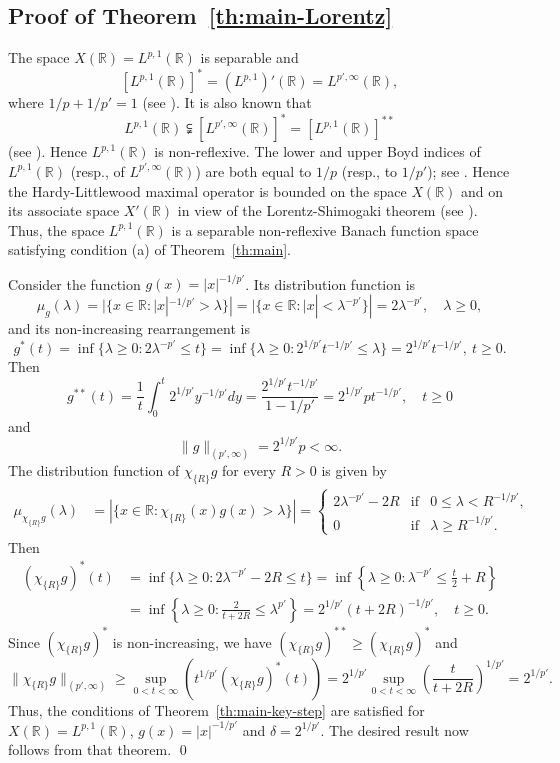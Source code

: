 \documentclass[reqno]{amsproc}
\newcommand{\R}{\mathbb{R}}
\theoremstyle{definition}
\theoremstyle{remark}
\numberwithin{equation}{section}
\begin{document}
\subsection{Proof of Theorem~\ref{th:main-Lorentz}}
The space $X(\mathbb{R}) = L^{p, 1}(\mathbb{R})$ is separable and 
\[
\left[L^{p, 1}(\mathbb{R})\right]^* 
= 
\left(L^{p, 1}\right)' (\mathbb{R})
= 
L^{p', \infty}(\mathbb{R}),
\]
where $1/p + 1/p' = 1$ (see \cite[Chap. 1, Corollaries 4.3 and 5.6, 
Chap. 4, Corollary 4.8]{BS88}). 
It is also known that 
\[
L^{p,1}(\R)\subsetneqq [L^{p',\infty}(\R)]^*=[L^{p,1}(\R)]^{**}
\]
(see \cite[p.~83]{C75}). Hence $L^{p,1}(\R)$ is non-reflexive.
The lower and upper Boyd indices of 
$L^{p, 1}(\mathbb{R})$ (resp., of $L^{p', \infty}(\mathbb{R})$) are both 
equal to $1/p$ (resp., to $1/p'$); see \cite[Chap. 4, Theorem 4.6]{BS88}. 
Hence the Hardy-Littlewood maximal operator is bounded on the space 
$X(\mathbb{R})$ and on its associate space $X'(\mathbb{R})$ in view of the 
Lorentz-Shimogaki theorem (see \cite[Chap. 3, Theorem 5.17]{BS88}). Thus, the 
space $L^{p,1}(\R)$ is a separable non-reflexive Banach function space
satisfying condition (a) of Theorem~\ref{th:main}.

Consider the function $g(x)=|x|^{-1/p'}$. Its distribution function is
\[
\mu_g(\lambda)
=
|\{x\in\R:|x|^{-1/p'}>\lambda\}|
=
|\{x\in\R:|x|<\lambda^{-p'}\}|=2\lambda^{-p'}, 
\quad
\lambda\ge 0,
\]
and its non-increasing rearrangement is
\[
g^*(t)
=
\inf\{\lambda\ge 0: 2\lambda^{-p'}\le t\}
=
\inf\{\lambda\ge 0: 2^{1/p'}t^{-1/p'}\le \lambda\}
=
2^{1/p'}t^{-1/p'},
\ t\ge 0.
\]
Then
\[
g^{**}(t)
=
\frac{1}{t}\int_0^t 2^{1/p'}y^{-1/p'}dy
=\frac{2^{1/p'}t^{-1/p'}}{1-1/p'}
=
2^{1/p'}pt^{-1/p'},
\quad t\ge 0
\]
and
\[
\|g\|_{(p',\infty)}=2^{1/p'}p<\infty.
\]
The distribution function of $\chi_{\{R\}}g$ for every $R>0$ is given by
\begin{align*}
\mu_{\chi_{\{R\}}g}(\lambda)
&=
|\{x\in\R:\chi_{\{R\}}(x)g(x)>\lambda\}|
=
\left\{\begin{array}{lll}
2\lambda^{-p'}-2R & \mbox{if}& 0\le\lambda<R^{-1/p'},
\\
0 &\mbox{if}& \lambda\ge R^{-1/p'}.
\end{array}\right.
\end{align*}
Then
\begin{align*}
(\chi_{\{R\}}g)^*(t)
&=
\inf\{\lambda\ge 0 : 2\lambda^{-p'}-2R\le t\}
=
\inf\left\{\lambda\ge 0:\lambda^{-p'}\le\frac{t}{2}+R\right\}
\\
&=
\inf\left\{\lambda\ge 0:\frac{2}{t+2R}\le\lambda^{p'}\right\}
=
2^{1/p'}(t+2R)^{-1/p'},
\quad
t\ge 0.
\end{align*}
Since $(\chi_{\{R\}}g)^*$ is non-increasing, we have
$(\chi_{\{R\}}g)^{**}\ge (\chi_{\{R\}}g)^*$ and
\[
\|\chi_{\{R\}}g\|_{(p',\infty)}
\ge 
\sup_{0<t<\infty}\left(t^{1/p'}(\chi_{\{R\}}g)^*(t)\right)
=
2^{1/p'}\sup_{0<t<\infty}
\left(\frac{t}{t+2R}\right)^{1/p'}
=
2^{1/p'}.
\]
Thus, the conditions of Theorem~\ref{th:main-key-step} are satisfied for
$X(\R)=L^{p,1}(\R)$, $g(x)=|x|^{-1/p'}$ and $\delta=2^{1/p'}$.
The desired result now follows from that theorem.
\qed
\end{document}
